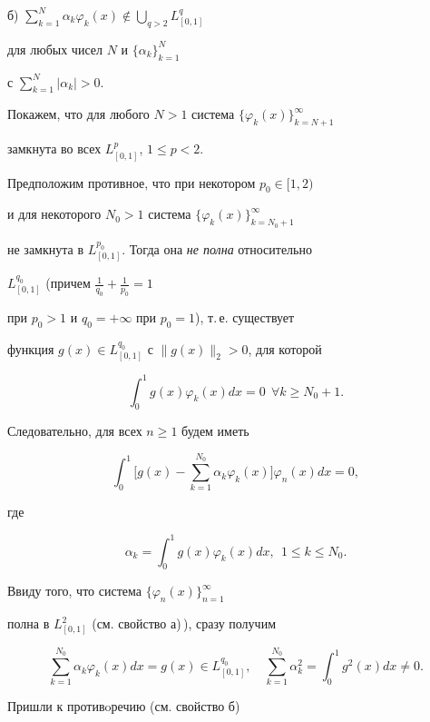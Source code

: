 \begin{pf}
б) $\sum\limits_{k=1}^N \alpha_k\varphi_k(x)\notin


\bigcup\limits_{q>2} L^q_{[0,1]}$


для любых чисел $N$ и $\{\alpha_k\}_{k=1}^N$


с $\sum\limits_{k=1}^N |\alpha_k|>0$.





Покажем, что для любого $N>1$ система $\{\varphi_k(x)\}_{k=N+1}^\infty$ 


замкнута во всех $L^p_{[0,1]}$, $1{\leq} p{<}2$.


Предположим противное, что при некотором $p_0\in [1,2)$


и для некоторого $N_0>1$ система $\{\varphi_k(x)\}_{k=N_0+1}^\infty$


не замкнута в $L^{p_0}_{[0,1]}$. Тогда она {\it не полна} относительно 


$L^{q_0}_{[0,1]}$ (причем $\frac{1}{{q_0}}+\frac{1}{{p_0}}=1$


при $p_0>1$ и $q_0=+\infty$ при $p_0=1$), т.\,е. существует 


функция $g(x)\in L^{q_0}_{[0,1]}$ с $\|g(x)\|_2>0$, для которой


$$


\int_0^1 g(x)\varphi_k(x)dx=0\ \ \forall k\geq N_0+1.


$$


Следовательно, для всех $n \geq 1$ будем иметь


$$


\int_0^1\bigg[ g(x)-\sum_{k=1}^{N_0} \alpha_k \varphi_k(x) \bigg]


\varphi_n(x)dx=0,


$$


где


$$


\alpha_k=\int_0^1 g(x)\varphi_k(x)dx,\ \ 1\leq k \leq N_0.


$$


Ввиду того, что система $\{\varphi_n(x)\}_{n=1}^\infty$


полна в $L^2_{[0,1]}$ (см. свойство а)\,), сразу получим


$$


\sum_{k=1}^{N_0} \alpha_k \varphi_k(x)dx =g(x)\in L^{q_0}_{[0,1]},\quad


\sum_{k=1}^{N_0} \alpha_k^2=\int_0^1g^2(x)dx \ne0.


$$


Пришли к противoречию (см. свойство б)



\end{pf}
